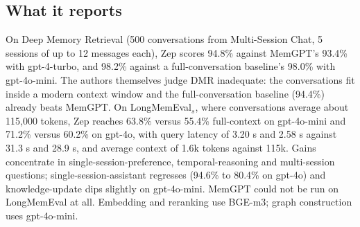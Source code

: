 \subsection{What it reports}

On Deep Memory Retrieval (500 conversations from Multi-Session Chat, 5 sessions of up to 12 messages each), Zep scores 94.8\% against MemGPT's 93.4\% with gpt-4-turbo, and 98.2\% against a full-conversation baseline's 98.0\% with gpt-4o-mini. The authors themselves judge DMR inadequate: the conversations fit inside a modern context window and the full-conversation baseline (94.4\%) already beats MemGPT. On LongMemEval$_s$, where conversations average about 115,000 tokens, Zep reaches 63.8\% versus 55.4\% full-context on gpt-4o-mini and 71.2\% versus 60.2\% on gpt-4o, with query latency of 3.20 s and 2.58 s against 31.3 s and 28.9 s, and average context of 1.6k tokens against 115k. Gains concentrate in single-session-preference, temporal-reasoning and multi-session questions; single-session-assistant regresses (94.6\% to 80.4\% on gpt-4o) and knowledge-update dips slightly on gpt-4o-mini. MemGPT could not be run on LongMemEval at all. Embedding and reranking use BGE-m3; graph construction uses gpt-4o-mini.

